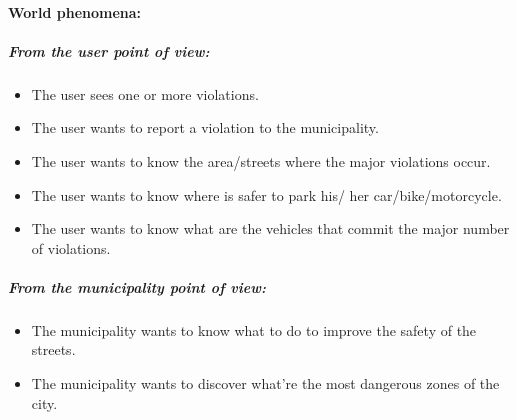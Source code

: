 \documentclass[titlepage]{article}
\begin{document}
\paragraph{World phenomena: }
\subparagraph{From the user point of view: }
\begin{itemize}	
	\item The user sees one or more violations.
	\item The user wants to report a violation to the 					  municipality.
	\item The user wants to know the area/streets where the 
	     major violations occur.
	\item The user wants to know where is safer to park his/			  her car/bike/motorcycle.
	\item The user wants to know what are the vehicles that       		  commit the major number of violations.

\end{itemize}
\subparagraph{From the municipality point of view: }

\begin{itemize}
	\item The municipality wants to know what to do to 				improve the safety of the streets.
	\item The municipality wants to discover what're the most
	dangerous zones of the city.\\
\end{itemize}
 
\end{document}
